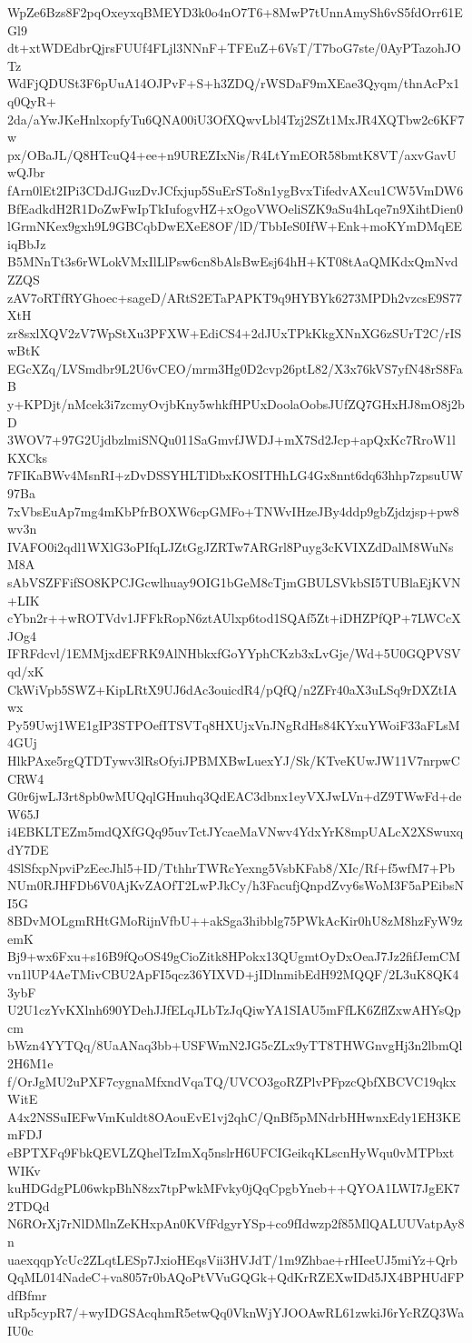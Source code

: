 WpZe6Bzs8F2pqOxeyxqBMEYD3k0o4nO7T6+8MwP7tUnnAmySh6vS5fdOrr61EGl9
dt+xtWDEdbrQjrsFUUf4FLjl3NNnF+TFEuZ+6VsT/T7boG7ste/0AyPTazohJOTz
WdFjQDUSt3F6pUuA14OJPvF+S+h3ZDQ/rWSDaF9mXEae3Qyqm/thnAcPx1q0QyR+
2da/aYwJKeHnlxopfyTu6QNA00iU3OfXQwvLbl4Tzj2SZt1MxJR4XQTbw2c6KF7w
px/OBaJL/Q8HTcuQ4+ee+n9UREZIxNis/R4LtYmEOR58bmtK8VT/axvGavUwQJbr
fArn0lEt2IPi3CDdJGuzDvJCfxjup5SuErSTo8n1ygBvxTifedvAXcu1CW5VmDW6
BfEadkdH2R1DoZwFwIpTkIufogvHZ+xOgoVWOeliSZK9aSu4hLqe7n9XihtDien0
lGrmNKex9gxh9L9GBCqbDwEXeE8OF/lD/TbbIeS0IfW+Enk+moKYmDMqEEiqBbJz
B5MNnTt3s6rWLokVMxIlLlPsw6cn8bAlsBwEsj64hH+KT08tAaQMKdxQmNvdZZQS
zAV7oRTfRYGhoec+sageD/ARtS2ETaPAPKT9q9HYBYk6273MPDh2vzcsE9S77XtH
zr8sxlXQV2zV7WpStXu3PFXW+EdiCS4+2dJUxTPkKkgXNnXG6zSUrT2C/rISwBtK
EGcXZq/LVSmdbr9L2U6vCEO/mrm3Hg0D2cvp26ptL82/X3x76kVS7yfN48rS8FaB
y+KPDjt/nMcek3i7zcmyOvjbKny5whkfHPUxDoolaOobsJUfZQ7GHxHJ8mO8j2bD
3WOV7+97G2UjdbzlmiSNQu011SaGmvfJWDJ+mX7Sd2Jcp+apQxKc7RroW1lKXCks
7FIKaBWv4MsnRI+zDvDSSYHLTlDbxKOSITHhLG4Gx8nnt6dq63hhp7zpsuUW97Ba
7xVbsEuAp7mg4mKbPfrBOXW6cpGMFo+TNWvIHzeJBy4ddp9gbZjdzjsp+pw8wv3n
IVAFO0i2qdl1WXlG3oPIfqLJZtGgJZRTw7ARGrl8Puyg3cKVIXZdDalM8WuNsM8A
sAbVSZFFifSO8KPCJGcwlhuay9OIG1bGeM8cTjmGBULSVkbSI5TUBlaEjKVN+LIK
cYbn2r++wROTVdv1JFFkRopN6ztAUlxp6tod1SQAf5Zt+iDHZPfQP+7LWCcXJOg4
IFRFdcvl/1EMMjxdEFRK9AlNHbkxfGoYYphCKzb3xLvGje/Wd+5U0GQPVSVqd/xK
CkWiVpb5SWZ+KipLRtX9UJ6dAc3ouicdR4/pQfQ/n2ZFr40aX3uLSq9rDXZtIAwx
Py59Uwj1WE1gIP3STPOefITSVTq8HXUjxVnJNgRdHs84KYxuYWoiF33aFLsM4GUj
HlkPAxe5rgQTDTywv3lRsOfyiJPBMXBwLuexYJ/Sk/KTveKUwJW11V7nrpwCCRW4
G0r6jwLJ3rt8pb0wMUQqlGHnuhq3QdEAC3dbnx1eyVXJwLVn+dZ9TWwFd+deW65J
i4EBKLTEZm5mdQXfGQq95uvTctJYcaeMaVNwv4YdxYrK8mpUALcX2XSwuxqdY7DE
4SlSfxpNpviPzEecJhl5+ID/TthhrTWRcYexng5VsbKFab8/XIc/Rf+f5wfM7+Pb
NUm0RJHFDb6V0AjKvZAOfT2LwPJkCy/h3FacufjQnpdZvy6sWoM3F5aPEibsNI5G
8BDvMOLgmRHtGMoRijnVfbU++akSga3hibblg75PWkAcKir0hU8zM8hzFyW9zemK
Bj9+wx6Fxu+s16B9fQoOS49gCioZitk8HPokx13QUgmtOyDxOeaJ7Jz2fifJemCM
vn1lUP4AeTMivCBU2ApFI5qcz36YIXVD+jIDlnmibEdH92MQQF/2L3uK8QK43ybF
U2U1czYvKXlnh690YDehJJfELqJLbTzJqQiwYA1SIAU5mFfLK6ZflZxwAHYsQpcm
bWzn4YYTQq/8UaANaq3bb+USFWmN2JG5cZLx9yTT8THWGnvgHj3n2lbmQl2H6M1e
f/OrJgMU2uPXF7cygnaMfxndVqaTQ/UVCO3goRZPlvPFpzcQbfXBCVC19qkxWitE
A4x2NSSuIEFwVmKuldt8OAouEvE1vj2qhC/QnBf5pMNdrbHHwnxEdy1EH3KEmFDJ
eBPTXFq9FbkQEVLZQhelTzImXq5nslrH6UFCIGeikqKLscnHyWqu0vMTPbxtWIKv
kuHDGdgPL06wkpBhN8zx7tpPwkMFvky0jQqCpgbYneb++QYOA1LWI7JgEK72TDQd
N6ROrXj7rNlDMlnZeKHxpAn0KVfFdgyrYSp+co9fIdwzp2f85MlQALUUVatpAy8n
uaexqqpYcUc2ZLqtLESp7JxioHEqsVii3HVJdT/1m9Zhbae+rHIeeUJ5miYz+Qrb
QqML014NadeC+va8057r0bAQoPtVVuGQGk+QdKrRZEXwIDd5JX4BPHUdFPdfBfmr
uRp5cypR7/+wyIDGSAcqhmR5etwQq0VknWjYJOOAwRL61zwkiJ6rYcRZQ3WaIU0c
